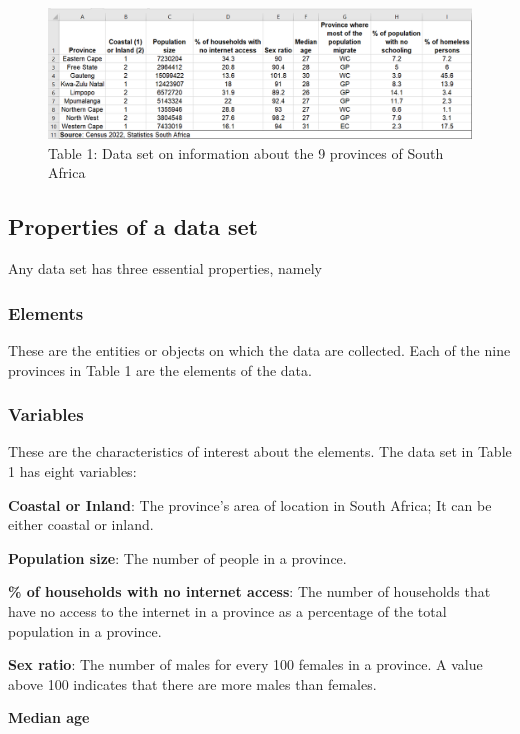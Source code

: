 \documentclass[
]{book}
\begin{document}
\begin{figure}
\centering
\includegraphics{images/clipboard-533064056.png}
\caption{Table 1: Data set on information about the 9 provinces of South Africa}
\end{figure}

\subsection{Properties of a data set}\label{properties-of-a-data-set}

Any data set has three essential properties, namely

\subsubsection{Elements}\label{elements}

These are the entities or objects on which the data are collected. Each of the nine provinces in Table 1 are the elements of the data.

\subsubsection{Variables}\label{variables}

These are the characteristics of interest about the elements. The data set in Table 1 has eight variables:

\textbf{Coastal or Inland}: The province's area of location in South Africa; It can be either coastal or inland.

\textbf{Population size}: The number of people in a province.

\textbf{\% of households with no internet access}: The number of households that have no access to the internet in a province as a percentage of the total population in a province.

\textbf{Sex ratio}: The number of males for every 100 females in a province. A value above 100 indicates that there are more males than females.

\textbf{Median age}
\end{document}
